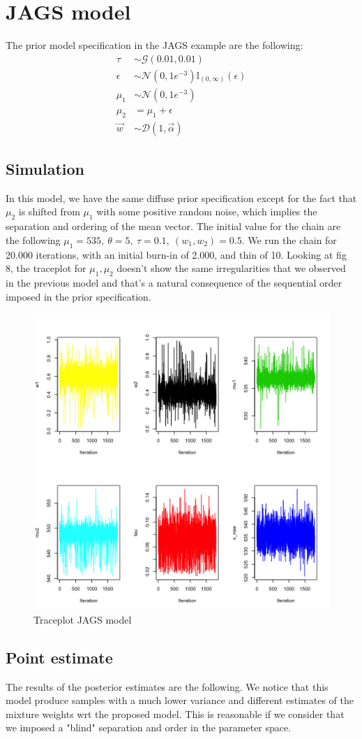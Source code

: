 \documentclass{article}
\begin{document}
\section{JAGS model}
The prior model specification in the JAGS example are the following:
\begin{align*}
\tau &\sim \mathcal{G}(0.01, 0.01) \\
\epsilon &\sim \mathcal{N}(0, 1e^{-3}) \mathbb{I}_{(0, \infty)}(\epsilon) \\ 
\mu_1 &\sim \mathcal{N}(0, 1e^{-3}) \\
\mu_2 &= \mu_1 + \epsilon \\
\vec w &\sim \mathcal{D}(1, \vec \alpha)
\end{align*}

\subsection{Simulation}
In this model, we have the same diffuse prior specification except for the fact that $\mu_2$ is shifted from $\mu_1$ with some positive random noise, which implies the separation and ordering of the mean vector. The initial value for the chain are the following $\mu_1 = 535, \ \theta = 5, \ \tau = 0.1,\ (w_1, w_2) = 0.5$. We run the chain for 20.000 iterations, with an initial burn-in of 2.000, and thin of 10. Looking at fig 8, the traceplot for $\mu_1, \mu_2$ doesn't show the same irregularities that we observed in the previous model and that's a natural consequence of the sequential order imposed in the prior specification. 

\begin{figure}[h!]
    \centering
    \includegraphics[width=.5\textwidth]{plot_9.png}
    \caption{Traceplot JAGS model}
    \label{Monkey measurement}
\end{figure}

\subsection{Point estimate}
The results of the posterior estimates are the following. We notice that this model produce samples with a much lower variance and different estimates of the mixture weights wrt the proposed model. This is reasonable if we consider that we imposed a "blind" separation and order in the parameter space.
\end{document}
